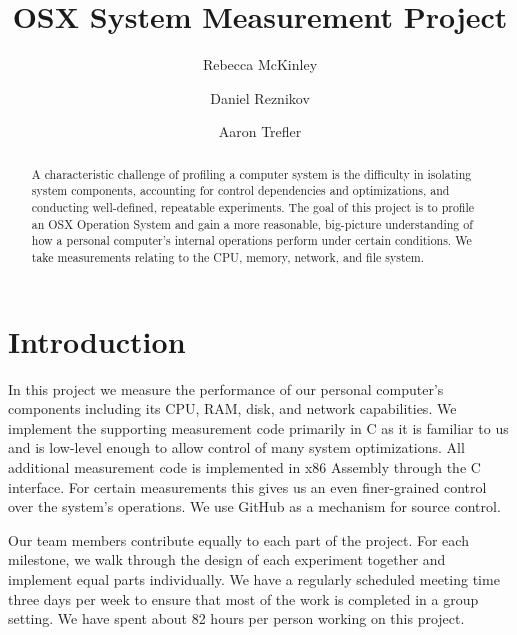 \documentclass[sigconf]{acmart}
\begin{document}
\title{OSX System Measurement Project}

\author{Rebecca McKinley}

\author{Daniel Reznikov}


\author{Aaron Trefler}

\begin{abstract}
A characteristic challenge of profiling a computer system is the difficulty in isolating system components, accounting for control dependencies and optimizations, and conducting well-defined, repeatable experiments. The goal of this project is to profile an OSX Operation System and gain a more reasonable, big-picture understanding of how a personal computer's internal operations perform under certain conditions. We take measurements relating to the CPU, memory, network, and file system.
\end{abstract}

\maketitle

\section{Introduction}
In this project we measure the performance of our personal computer's components including its CPU, RAM, disk, and network capabilities. We implement the supporting measurement code primarily in C as it is familiar to us and is low-level enough to allow control of many system optimizations. All additional measurement code is implemented in x86 Assembly through the C interface. For certain measurements this gives us an even finer-grained control over the system's operations. We use GitHub as a mechanism for source control.

Our team members contribute equally to each part of the project. For each milestone, we walk through the design of each experiment together and implement equal parts individually. We have a regularly scheduled meeting time three days per week to ensure that most of the work is completed in a group setting. We have spent about 82 hours per person working on this project.
\end{document}
